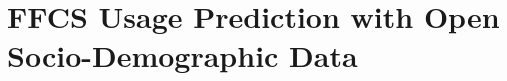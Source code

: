 
\chapter{FFCS Usage Prediction with Open Socio-Demographic Data}
\label{chap:8_prediction}
	\graphicspath{{Chapter8/}}















